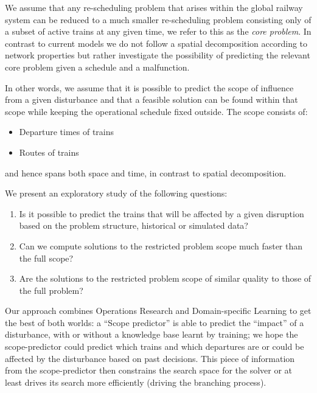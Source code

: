 \documentclass{article}
\begin{document}
We assume that any re-scheduling problem that arises within the global railway system can be reduced to a much smaller re-scheduling problem consisting only of a subset of active trains at any given time, we refer to this as the \emph{core problem}. In contrast to current models we do not follow a spatial decomposition according to network properties but rather investigate the possibility of predicting the relevant core problem given a schedule and a malfunction.

In other words, we assume that it is possible to predict the scope of influence from a given disturbance and that a feasible solution can be found within that scope while keeping the operational schedule fixed outside. The scope consists of:
\begin{itemize}
    \item Departure times of trains
    \item Routes of trains
\end{itemize}
and hence spans both space and time, in contrast to spatial decomposition.


We present an exploratory study of the following questions:
\begin{enumerate}
\item Is it possible to predict the trains that will be affected by a given disruption based on the problem structure, historical or simulated data?
\item Can we compute solutions to the restricted problem scope much faster than the full scope?
\item Are the solutions to the restricted problem scope of similar quality to those of the full problem?
\end{enumerate}

Our approach combines Operations Research and Domain-specific Learning to get the best of both worlds: a ``Scope predictor'' is able to predict the ``impact'' of a disturbance, with or without a knowledge base learnt by training; we hope the scope-predictor could predict which trains and which departures are or could be affected by the disturbance based on past decisions. This piece of information from the scope-predictor then constrains the search space for the solver or at least drives its search more efficiently (driving the branching process).
\end{document}
